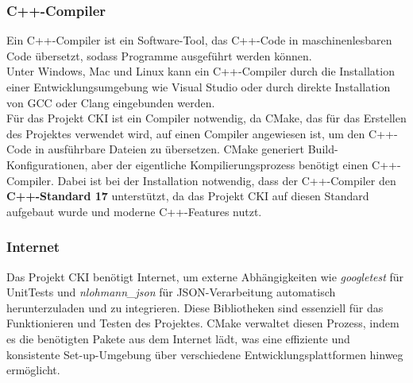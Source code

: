 \subsubsection{C++-Compiler}
\label{sec:BuildCCompiler}
Ein C++-Compiler ist ein Software-Tool, das C++-Code in maschinenlesbaren Code übersetzt, sodass Programme ausgeführt werden können. 
\\
Unter Windows, Mac und Linux kann ein C++-Compiler durch die Installation einer Entwicklungsumgebung wie Visual Studio oder durch direkte Installation von GCC oder Clang eingebunden werden. 
\\
Für das Projekt CKI ist ein Compiler notwendig, da CMake, das für das Erstellen des Projektes verwendet wird, auf einen Compiler angewiesen ist, um den C++-Code in ausführbare Dateien zu übersetzen. CMake generiert Build-Konfigurationen, aber der eigentliche Kompilierungsprozess benötigt einen C++-Compiler. Dabei ist bei der Installation notwendig, dass der C++-Compiler den \textbf{C++-Standard 17} unterstützt, da das Projekt CKI auf diesen Standard aufgebaut wurde und moderne C++-Features nutzt.

\subsubsection{Internet}
\label{sec:BuildInternet}
Das Projekt CKI benötigt Internet, um externe Abhängigkeiten wie \textit{googletest} für Unit\-Tests und \textit{nlohmann\_json} für JSON-Verarbeitung automatisch herunterzuladen und zu integrieren. Diese Bibliotheken sind essenziell für das Funktionieren und Testen des Projektes. CMake verwaltet diesen Prozess, indem es die benötigten Pakete aus dem Internet lädt, was eine effiziente und konsistente Set-up-Umgebung über verschiedene Entwicklungsplattformen hinweg ermöglicht.

